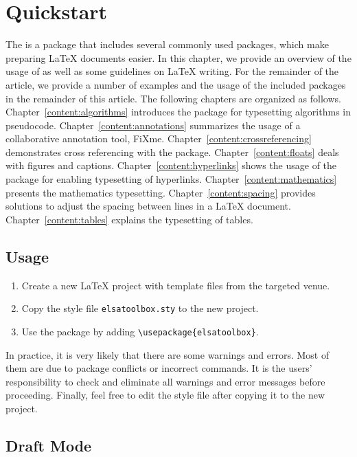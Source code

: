 \chapter{Quickstart}
\label{content:quickstart}

The \elsatoolbox{} is a package that includes several commonly used packages, which make preparing \LaTeX{} documents easier. In this chapter, we provide an overview of the usage of \elsatoolbox{} as well as some guidelines on \LaTeX{} writing. For the remainder of the article, we provide a number of examples and the usage of the included packages in the remainder of this article. The following chapters are organized as follows. Chapter~\ref{content:algorithms} introduces the  package for typesetting algorithms in pseudocode. Chapter~\ref{content:annotations} summarizes the usage of a collaborative annotation tool, FiXme. Chapter~\ref{content:crossreferencing} demonstrates cross referencing with the  package. Chapter~\ref{content:floats} deals with figures and captions. Chapter~\ref{content:hyperlinks} shows the usage of the  package for enabling typesetting of hyperlinks. Chapter~\ref{content:mathematics} presents the mathematics typesetting. Chapter~\ref{content:spacing} provides solutions to adjust the spacing between lines in a \LaTeX{} document. Chapter~\ref{content:tables} explains the typesetting of tables.

\section*{Usage}

\begin{enumerate}
    \item Create a new \LaTeX{} project with template files from the targeted venue.
    \item Copy the style file \texttt{elsatoolbox.sty} to the new project.
    \item Use the \elsatoolbox{} package by adding \verb|\usepackage{elsatoolbox}|.
\end{enumerate}

In practice, it is very likely that there are some warnings and errors. Most of them are due to package conflicts or incorrect commands. It is the users' responsibility to check and eliminate all warnings and error messages before proceeding. Finally, feel free to edit the style file after copying it to the new project.

\section*{Draft Mode}

